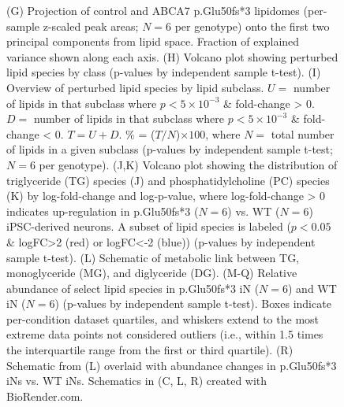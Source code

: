\begin{figure}[ht]
{        (G) Projection of control and ABCA7 p.Glu50fs*3 lipidomes (per-sample z-scaled peak areas; $N=6$ per genotype) onto the first two principal components from lipid space. Fraction of explained variance shown along each axis. 
        (H) Volcano plot showing perturbed lipid species by class (p-values by independent sample t-test). 
        (I) Overview of perturbed lipid species by lipid subclass. $U =$ number of lipids in that subclass where $p<5 \times 10^{-3}$ \& fold-change > 0. $D =$ number of lipids in that subclass where $p<5 \times 10^{-3}$ \& fold-change < 0. $T = U + D$. \% = ($T/N$)$\times 100$, where $N =$ total number of lipids in a given subclass (p-values by independent sample t-test; $N=6$ per genotype). (J,K) Volcano plot showing the distribution of triglyceride (TG) species 
        (J) and phosphatidylcholine (PC) species (K) by log-fold-change and log-p-value, where log-fold-change > 0 indicates up-regulation in p.Glu50fs*3 ($N=6$) vs. WT ($N=6$) iPSC-derived neurons. A subset of lipid species is labeled ($p<0.05$ \& logFC>2 (red) or logFC<-2 (blue)) (p-values by independent sample t-test). 
        (L) Schematic of metabolic link between TG, monoglyceride (MG), and diglyceride (DG). 
        (M-Q) Relative abundance of select lipid species in p.Glu50fs*3 iN ($N=6$) and WT iN ($N=6$) (p-values by independent sample t-test). Boxes indicate per-condition dataset quartiles, and whiskers extend to the most extreme data points not considered outliers (i.e., within 1.5 times the interquartile range from the first or third quartile). (R) Schematic from (L) overlaid with abundance changes in p.Glu50fs*3 iNs vs. WT iNs. Schematics in (C, L, R) created with BioRender.com.
    }
    \label{fig:main_lipids}
\end{figure}